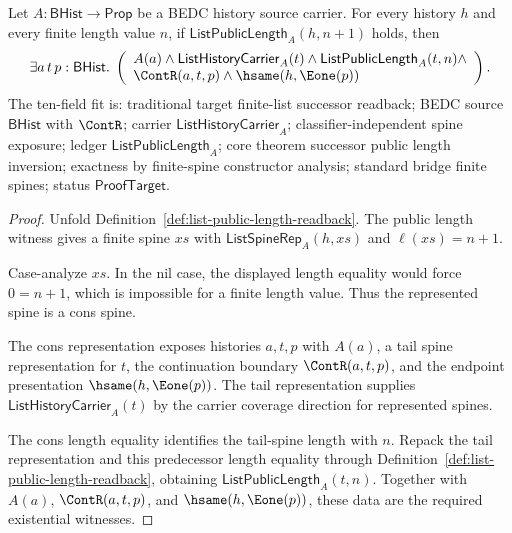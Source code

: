 \begin{theorem}
\label{thm:list-public-successor-length-cons-readback}
Let $A:\mathsf{BHist}\to\mathsf{Prop}$ be a BEDC history source carrier. For
every history $h$ and every finite length value $n$, if
$\mathsf{ListPublicLength}_A(h,n+1)$ holds, then
$$
\exists a\,t\,p:\mathsf{BHist}.\;
\left(
\begin{array}{l}
A(a)\land \mathsf{ListHistoryCarrier}_A(t)\land
\mathsf{ListPublicLength}_A(t,n)\land\\
\ContR(a,t,p)\land \hsame(h,\Eone(p))
\end{array}
\right).
$$
The ten-field fit is: traditional target finite-list successor readback; BEDC
source $\mathsf{BHist}$ with $\ContR$; carrier
$\mathsf{ListHistoryCarrier}_A$; classifier-independent spine exposure; ledger
$\mathsf{ListPublicLength}_A$; core theorem successor public length inversion;
exactness by finite-spine constructor analysis; standard bridge finite spines;
status $\mathsf{ProofTarget}$.
\end{theorem}
\begin{proof}
Unfold Definition~\ref{def:list-public-length-readback}. The public length
witness gives a finite spine $xs$ with $\mathsf{ListSpineRep}_A(h,xs)$ and
$\ell(xs)=n+1$.

Case-analyze $xs$. In the nil case, the displayed length equality would force
$0=n+1$, which is impossible for a finite length value. Thus the represented
spine is a cons spine.

The cons representation exposes histories $a,t,p$ with $A(a)$, a tail spine
representation for $t$, the continuation boundary $\ContR(a,t,p)$, and the
endpoint presentation $\hsame(h,\Eone(p))$. The tail representation supplies
$\mathsf{ListHistoryCarrier}_A(t)$ by the carrier coverage direction for
represented spines.

The cons length equality identifies the tail-spine length with $n$. Repack the
tail representation and this predecessor length equality through
Definition~\ref{def:list-public-length-readback}, obtaining
$\mathsf{ListPublicLength}_A(t,n)$. Together with $A(a)$, $\ContR(a,t,p)$, and
$\hsame(h,\Eone(p))$, these data are the required existential witnesses.
\end{proof}

